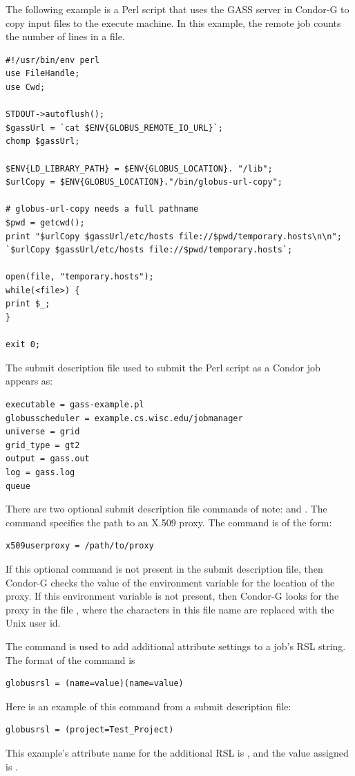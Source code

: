 The following example is a Perl script that uses the GASS server in Condor-G
to copy input files to the execute machine.
In this example, the remote job
counts the number of lines in a file.

\footnotesize
\begin{verbatim}
#!/usr/bin/env perl
use FileHandle;
use Cwd;

STDOUT->autoflush();
$gassUrl = `cat $ENV{GLOBUS_REMOTE_IO_URL}`;
chomp $gassUrl;

$ENV{LD_LIBRARY_PATH} = $ENV{GLOBUS_LOCATION}. "/lib";
$urlCopy = $ENV{GLOBUS_LOCATION}."/bin/globus-url-copy";

# globus-url-copy needs a full pathname
$pwd = getcwd();
print "$urlCopy $gassUrl/etc/hosts file://$pwd/temporary.hosts\n\n";
`$urlCopy $gassUrl/etc/hosts file://$pwd/temporary.hosts`;

open(file, "temporary.hosts");
while(<file>) {
print $_;
}

exit 0;
\end{verbatim}
\normalsize

The submit description file used to submit the Perl script as
a Condor job appears as:

\footnotesize
\begin{verbatim}
executable = gass-example.pl
globusscheduler = example.cs.wisc.edu/jobmanager
universe = grid
grid_type = gt2
output = gass.out
log = gass.log
queue
\end{verbatim}
\normalsize

There are two optional submit description file commands
of note:
 and
.
The  command specifies the path to
an X.509 proxy.
The command is of the form:
\begin{verbatim}
x509userproxy = /path/to/proxy
\end{verbatim}
If this optional command is not present in the submit description file,
then Condor-G checks the value of the environment variable
 for the location of the proxy.
If this environment variable is not present, then Condor-G
looks for the proxy in the file
,
where the characters \verb@XXXX@ in this file name are
replaced with the Unix user id.

The  command is used to add additional
attribute settings to a job's RSL string.
The format of the  command is
\begin{verbatim}
globusrsl = (name=value)(name=value)
\end{verbatim}
Here is an example of this command from a submit description file:
\begin{verbatim}
globusrsl = (project=Test_Project)
\end{verbatim}
This example's attribute name for the additional RSL is
, and the value assigned is .

